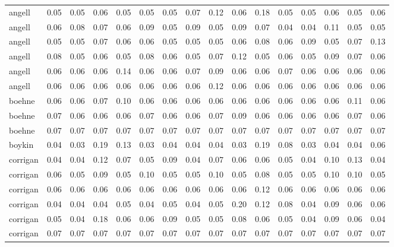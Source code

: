 \begin{tabular}{lrrrrrrrrrrrrrrr}
    angell & 0.05 & 0.05 & 0.06 & 0.05 & 0.05 & 0.05 & 0.07 & 0.12 & 0.06 &  0.18 &  0.05 &  0.05 &  0.06 &  0.05 &  0.06 \\
    angell & 0.06 & 0.08 & 0.07 & 0.06 & 0.09 & 0.05 & 0.09 & 0.05 & 0.09 &  0.07 &  0.04 &  0.04 &  0.11 &  0.05 &  0.05 \\
    angell & 0.05 & 0.05 & 0.07 & 0.06 & 0.06 & 0.05 & 0.05 & 0.05 & 0.06 &  0.08 &  0.06 &  0.09 &  0.05 &  0.07 &  0.13 \\
    angell & 0.08 & 0.05 & 0.06 & 0.05 & 0.08 & 0.06 & 0.05 & 0.07 & 0.12 &  0.05 &  0.06 &  0.05 &  0.09 &  0.07 &  0.06 \\
    angell & 0.06 & 0.06 & 0.06 & 0.14 & 0.06 & 0.06 & 0.07 & 0.09 & 0.06 &  0.06 &  0.07 &  0.06 &  0.06 &  0.06 &  0.06 \\
    angell & 0.06 & 0.06 & 0.06 & 0.06 & 0.06 & 0.06 & 0.06 & 0.12 & 0.06 &  0.06 &  0.06 &  0.06 &  0.06 &  0.06 &  0.06 \\
    boehne & 0.06 & 0.06 & 0.07 & 0.10 & 0.06 & 0.06 & 0.06 & 0.06 & 0.06 &  0.06 &  0.06 &  0.06 &  0.06 &  0.11 &  0.06 \\
    boehne & 0.07 & 0.06 & 0.06 & 0.06 & 0.07 & 0.06 & 0.06 & 0.07 & 0.09 &  0.06 &  0.06 &  0.06 &  0.06 &  0.07 &  0.06 \\
    boehne & 0.07 & 0.07 & 0.07 & 0.07 & 0.07 & 0.07 & 0.07 & 0.07 & 0.07 &  0.07 &  0.07 &  0.07 &  0.07 &  0.07 &  0.07 \\
    boykin & 0.04 & 0.03 & 0.19 & 0.13 & 0.03 & 0.04 & 0.04 & 0.04 & 0.03 &  0.19 &  0.08 &  0.03 &  0.04 &  0.04 &  0.06 \\
  corrigan & 0.04 & 0.04 & 0.12 & 0.07 & 0.05 & 0.09 & 0.04 & 0.07 & 0.06 &  0.06 &  0.05 &  0.04 &  0.10 &  0.13 &  0.04 \\
  corrigan & 0.06 & 0.05 & 0.09 & 0.05 & 0.10 & 0.05 & 0.05 & 0.10 & 0.05 &  0.08 &  0.05 &  0.05 &  0.10 &  0.10 &  0.05 \\
  corrigan & 0.06 & 0.06 & 0.06 & 0.06 & 0.06 & 0.06 & 0.06 & 0.06 & 0.06 &  0.12 &  0.06 &  0.06 &  0.06 &  0.06 &  0.06 \\
  corrigan & 0.04 & 0.04 & 0.04 & 0.05 & 0.04 & 0.05 & 0.04 & 0.05 & 0.20 &  0.12 &  0.08 &  0.04 &  0.09 &  0.06 &  0.06 \\
  corrigan & 0.05 & 0.04 & 0.18 & 0.06 & 0.06 & 0.09 & 0.05 & 0.05 & 0.08 &  0.06 &  0.05 &  0.04 &  0.09 &  0.06 &  0.04 \\
  corrigan & 0.07 & 0.07 & 0.07 & 0.07 & 0.07 & 0.07 & 0.07 & 0.07 & 0.07 &  0.07 &  0.07 &  0.07 &  0.07 &  0.07 &  0.07 \\

\end{tabular}
